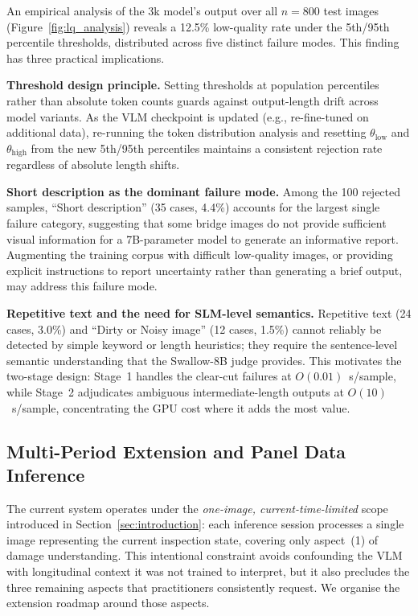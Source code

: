 \documentclass[twocolumn]{article}
\begin{document}
An empirical analysis of the 3k model's output over all $n=800$ test images
(Figure~\ref{fig:lq_analysis}) reveals a 12.5\% low-quality rate under the
5th/95th percentile thresholds, distributed across five distinct failure
modes.  This finding has three practical implications.

\textbf{Threshold design principle.}
Setting thresholds at population percentiles rather than absolute token counts
guards against output-length drift across model variants.
As the VLM checkpoint is updated (e.g., re-fine-tuned on additional data),
re-running the token distribution analysis and resetting $\theta_{\text{low}}$
and $\theta_{\text{high}}$ from the new 5th/95th percentiles maintains a
consistent rejection rate regardless of absolute length shifts.

\textbf{Short description as the dominant failure mode.}
Among the 100 rejected samples, ``Short description'' (35 cases, 4.4\%)
accounts for the largest single failure category,
suggesting that some bridge images do not provide sufficient visual
information for a 7B-parameter model to generate an informative report.
Augmenting the training corpus with difficult low-quality images, or
providing explicit instructions to report uncertainty rather than generating
a brief output, may address this failure mode.

\textbf{Repetitive text and the need for SLM-level semantics.}
Repetitive text (24 cases, 3.0\%) and ``Dirty or Noisy image'' (12 cases,
1.5\%) cannot reliably be detected by simple keyword or length heuristics;
they require the sentence-level semantic understanding that the Swallow-8B
judge provides.  This motivates the two-stage design: Stage~1 handles the
clear-cut failures at $O(0.01)$~s/sample, while Stage~2 adjudicates
ambiguous intermediate-length outputs at $O(10)$~s/sample, concentrating
the GPU cost where it adds the most value.

\subsection{Multi-Period Extension and Panel Data Inference}
\label{sec:disc_panel}

The current system operates under the
\textit{one-image, current-time-limited} scope introduced in
Section~\ref{sec:introduction}: each inference session processes a single
image representing the current inspection state, covering only aspect~(1)
of damage understanding.
This intentional constraint avoids confounding the VLM with longitudinal
context it was not trained to interpret, but it also precludes the three
remaining aspects that practitioners consistently request.
We organise the extension roadmap around those aspects.
\end{document}
